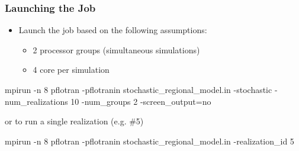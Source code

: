 \documentclass{beamer}
\begin{document}
\begin{frame}[fragile]\frametitle{Launching the Job}

\begin{itemize}
  \item Launch the job based on the following assumptions:
  \begin{itemize}
    \item 2 processor groups (simultaneous simulations)
    \item 4 core per simulation
  \end{itemize}

\end{itemize}

\begin{semiverbatim}
mpirun -n 8 pflotran
  -pflotranin stochastic_regional_model.in
  -stochastic
  -num_realizations 10
  -num_groups 2
  -screen_output=no
\end{semiverbatim}

or to run a single realization (e.g. \#5)

\begin{semiverbatim}
mpirun -n 8 pflotran
  -pflotranin stochastic_regional_model.in
  -realization_id 5
\end{semiverbatim}

\end{frame}
\end{document}
